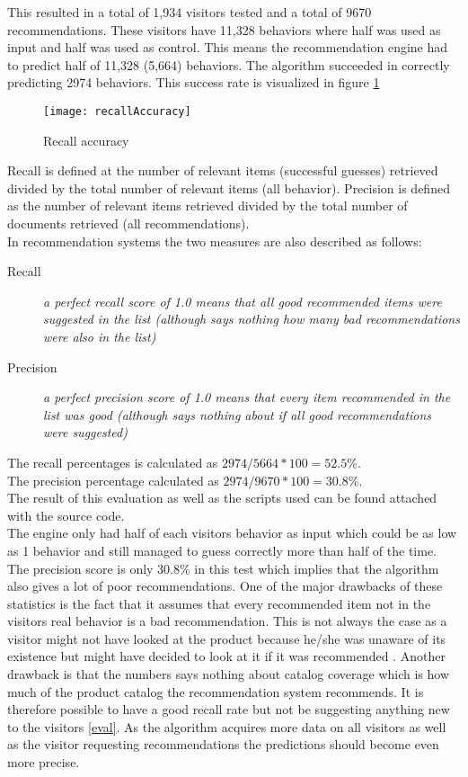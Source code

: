 This resulted in a total of 1,934 visitors tested and a total of 9670 recommendations. These visitors have 11,328 behaviors where half was used as input and half was used as control. This means the recommendation engine had to predict half of 11,328 (5,664) behaviors. The algorithm succeeded in correctly predicting 2974 behaviors. This success rate is visualized in figure \ref{recallAccuracy}   \\
\begin{figure}[H]
\centering
\texttt{[image: recallAccuracy]}
\caption{Recall accuracy}
\label{recallAccuracy}
\end{figure}
Recall is defined at the number of relevant items (successful guesses) retrieved divided by the total number of relevant items (all behavior). Precision is defined as the number of relevant items retrieved divided by the total number of documents retrieved (all recommendations). \\ In recommendation systems the two measures are also described as follows: 
\begin{description}
\item [Recall] \textit{a perfect recall score of 1.0 means that all good recommended items were suggested in the list (although says nothing how many bad recommendations were also in the list)} \cite{recallAndPrecision}
\item [Precision] \textit{a perfect precision score of 1.0 means that every item recommended in the list was good (although says nothing about if all good recommendations were suggested)} \cite{recallAndPrecision}
\end{description}
The recall percentages is calculated as \begin{math}2974/5664*100=52.5\%\end{math}. \\ The precision percentage calculated as \begin{math}2974/9670*100=30.8\%\end{math}. \\
The result of this evaluation as well as the scripts used can be found attached with the source code. \\
The engine only had half of each visitors behavior as input which could be as low as 1 behavior and still managed to guess correctly more than half of the time.
The precision score is only 30.8\% in this test which implies that the algorithm also gives a lot of poor recommendations. One of the major drawbacks of these statistics is the fact that it assumes that every recommended item not in the visitors real behavior is a bad recommendation. This is not always the case as a visitor might not have looked at the product because he/she was unaware of its existence but might have decided to look at it if it was recommended \cite{evaluatingRecommender}. Another drawback is that the numbers says nothing about catalog coverage which is how much of the product catalog the recommendation system recommends. It is therefore possible to have a good recall rate but not be suggesting anything new to the visitors \ref{eval}.
As the algorithm acquires more data on all visitors as well as the visitor requesting recommendations the predictions should become even more precise.

